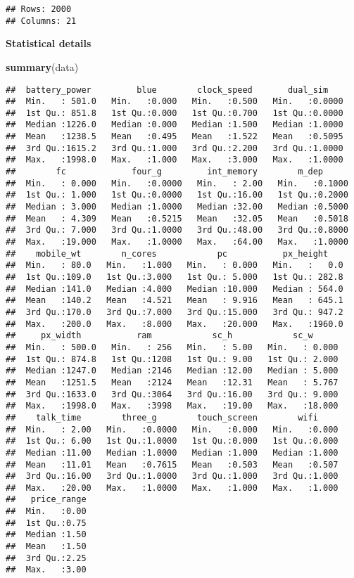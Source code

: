\documentclass[
]{article}
\newenvironment{Shaded}{\begin{snugshade}}{\end{snugshade}}
\newcommand{\FunctionTok}[1]{\textcolor[rgb]{0.13,0.29,0.53}{\textbf{#1}}}
\newcommand{\NormalTok}[1]{#1}
\begin{document}
\begin{verbatim}
## Rows: 2000 
## Columns: 21
\end{verbatim}

\textbf{Statistical details}

\begin{Shaded}
\begin{Highlighting}[]
\FunctionTok{summary}\NormalTok{(data)}
\end{Highlighting}
\end{Shaded}

\begin{verbatim}
##  battery_power         blue        clock_speed       dual_sim     
##  Min.   : 501.0   Min.   :0.000   Min.   :0.500   Min.   :0.0000  
##  1st Qu.: 851.8   1st Qu.:0.000   1st Qu.:0.700   1st Qu.:0.0000  
##  Median :1226.0   Median :0.000   Median :1.500   Median :1.0000  
##  Mean   :1238.5   Mean   :0.495   Mean   :1.522   Mean   :0.5095  
##  3rd Qu.:1615.2   3rd Qu.:1.000   3rd Qu.:2.200   3rd Qu.:1.0000  
##  Max.   :1998.0   Max.   :1.000   Max.   :3.000   Max.   :1.0000  
##        fc             four_g         int_memory        m_dep       
##  Min.   : 0.000   Min.   :0.0000   Min.   : 2.00   Min.   :0.1000  
##  1st Qu.: 1.000   1st Qu.:0.0000   1st Qu.:16.00   1st Qu.:0.2000  
##  Median : 3.000   Median :1.0000   Median :32.00   Median :0.5000  
##  Mean   : 4.309   Mean   :0.5215   Mean   :32.05   Mean   :0.5018  
##  3rd Qu.: 7.000   3rd Qu.:1.0000   3rd Qu.:48.00   3rd Qu.:0.8000  
##  Max.   :19.000   Max.   :1.0000   Max.   :64.00   Max.   :1.0000  
##    mobile_wt        n_cores            pc           px_height     
##  Min.   : 80.0   Min.   :1.000   Min.   : 0.000   Min.   :   0.0  
##  1st Qu.:109.0   1st Qu.:3.000   1st Qu.: 5.000   1st Qu.: 282.8  
##  Median :141.0   Median :4.000   Median :10.000   Median : 564.0  
##  Mean   :140.2   Mean   :4.521   Mean   : 9.916   Mean   : 645.1  
##  3rd Qu.:170.0   3rd Qu.:7.000   3rd Qu.:15.000   3rd Qu.: 947.2  
##  Max.   :200.0   Max.   :8.000   Max.   :20.000   Max.   :1960.0  
##     px_width           ram            sc_h            sc_w       
##  Min.   : 500.0   Min.   : 256   Min.   : 5.00   Min.   : 0.000  
##  1st Qu.: 874.8   1st Qu.:1208   1st Qu.: 9.00   1st Qu.: 2.000  
##  Median :1247.0   Median :2146   Median :12.00   Median : 5.000  
##  Mean   :1251.5   Mean   :2124   Mean   :12.31   Mean   : 5.767  
##  3rd Qu.:1633.0   3rd Qu.:3064   3rd Qu.:16.00   3rd Qu.: 9.000  
##  Max.   :1998.0   Max.   :3998   Max.   :19.00   Max.   :18.000  
##    talk_time        three_g        touch_screen        wifi      
##  Min.   : 2.00   Min.   :0.0000   Min.   :0.000   Min.   :0.000  
##  1st Qu.: 6.00   1st Qu.:1.0000   1st Qu.:0.000   1st Qu.:0.000  
##  Median :11.00   Median :1.0000   Median :1.000   Median :1.000  
##  Mean   :11.01   Mean   :0.7615   Mean   :0.503   Mean   :0.507  
##  3rd Qu.:16.00   3rd Qu.:1.0000   3rd Qu.:1.000   3rd Qu.:1.000  
##  Max.   :20.00   Max.   :1.0000   Max.   :1.000   Max.   :1.000  
##   price_range  
##  Min.   :0.00  
##  1st Qu.:0.75  
##  Median :1.50  
##  Mean   :1.50  
##  3rd Qu.:2.25  
##  Max.   :3.00
\end{verbatim}
\end{document}
